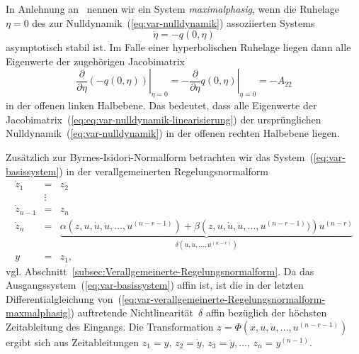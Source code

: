 In Anlehnung an~\cite{doyle96} nennen wir ein System \emph{maximalphasig},
wenn die Ruhelage $\eta=0$ des zur Nulldynamik~(\ref{eq:var-nulldynamik})
assoziierten Systems 
\begin{equation}
\dot{\eta}=-q(0,\eta)\label{eq:nulldynamik-maximalphasig}
\end{equation}
asymptotisch stabil ist. Im Falle einer hyperbolischen Ruhelage liegen
dann alle Eigenwerte der zugehörigen Jacobimatrix
\[
\left.\frac{\partial}{\partial\eta}\left(-q(0,\eta)\right)\right|_{\eta=0}=-\left.\frac{\partial}{\partial\eta}q(0,\eta)\right|_{\eta=0}=-A_{22}
\]
in der offenen linken Halbebene. Das bedeutet, dass alle Eigenwerte
der Jacobi\-matrix~(\ref{eq:eq:var-nulldynamik-linearisierung})
der ursprünglichen Nulldynamik~(\ref{eq:var-nulldynamik}) in der
offenen rechten Halbebene liegen.

Zusätzlich zur Byrnes-Isidori-Normalform betrachten wir das System~(\ref{eq:var-basissystem})
in der verallgemeinerten Regelungsnormalform
\begin{equation}
\begin{array}{lcl}
\dot{z}_{1} & = & z_{2}\\
 & \vdots\\
\dot{z}_{n-1} & = & z_{n}\\
\dot{z}_{n} & = & \underbrace{\alpha\left(z,u,\dot{u},\ddot{u},\ldots,u^{(n-r-1)}\right)+\beta\left(z,u,\dot{u},\ddot{u},\ldots,u^{(n-r-1)})\right)u^{(n-r)}}_{{\displaystyle \delta\left(u,\dot{u},\ldots,u^{(n-r)}\right)}}\\
y & = & z_{1},
\end{array}\label{eq:var-verallgemeinerte-Regelungsnormalform-maxmalphasig}
\end{equation}
vgl. Abschnitt~\ref{subsec:Verallgemeinerte-Regelungsnormalform}.
Da das Ausgangssystem~(\ref{eq:var-basissystem}) affin ist, ist
die in der letzten Differentialgleichung von~(\ref{eq:var-verallgemeinerte-Regelungsnormalform-maxmalphasig})
auftretende Nichtlinearität~$\delta$ affin bezüglich der höchsten
Zeitableitung des Eingangs. Die Transformation $z=\Phi(x,u,\dot{u},\ldots,u^{(n-r-1)})$
ergibt sich aus Zeitableitungen $z_{1}=y,\,z_{2}=\dot{y},\,z_{3}=\ddot{y},\ldots,\,z_{n}=y^{(n-1)}$.

